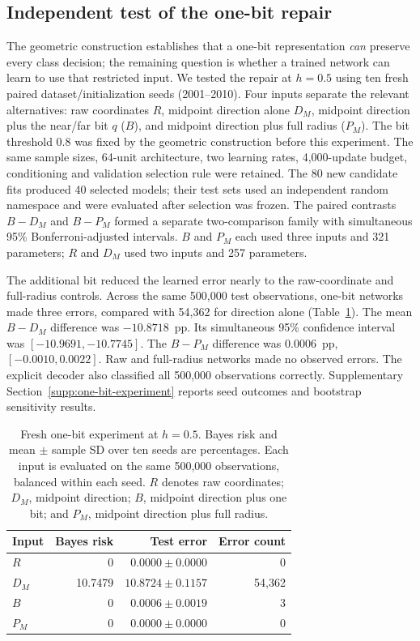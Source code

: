 \subsection{Independent test of the one-bit repair}
\label{sec:one-bit-experiment}
The geometric construction establishes that a one-bit representation \emph{can} preserve every class decision; the remaining question is whether a trained network can learn to use that restricted input. We tested the repair at $h=0.5$ using ten fresh paired dataset/initialization seeds (2001--2010). Four inputs separate the relevant alternatives: raw coordinates $R$, midpoint direction alone $D_M$, midpoint direction plus the near/far bit $q$ ($B$), and midpoint direction plus full radius ($P_M$). The bit threshold $0.8$ was fixed by the geometric construction before this experiment. The same sample sizes, 64-unit architecture, two learning rates, 4,000-update budget, conditioning and validation selection rule were retained. The 80 new candidate fits produced 40 selected models; their test sets used an independent random namespace and were evaluated after selection was frozen. The paired contrasts $B-D_M$ and $B-P_M$ formed a separate two-comparison family with simultaneous 95\% Bonferroni-adjusted intervals. $B$ and $P_M$ each used three inputs and 321 parameters; $R$ and $D_M$ used two inputs and 257 parameters.

The additional bit reduced the learned error nearly to the raw-coordinate and full-radius controls. Across the same 500,000 test observations, one-bit networks made three errors, compared with 54,362 for direction alone (Table~\ref{tab:one-bit-neural}). The mean $B-D_M$ difference was $-10.8718$~pp. Its simultaneous 95\% confidence interval was $[-10.9691,-10.7745]$. The $B-P_M$ difference was $0.0006$~pp, $[-0.0010,0.0022]$. Raw and full-radius networks made no observed errors. The explicit decoder also classified all 500,000 observations correctly. Supplementary Section~\ref{supp:one-bit-experiment} reports seed outcomes and bootstrap sensitivity results.

\begin{table}[t]
\centering\small
\setlength{\tabcolsep}{3pt}
\caption{Fresh one-bit experiment at $h=0.5$. Bayes risk and mean $\pm$ sample SD over ten seeds are percentages. Each input is evaluated on the same 500,000 observations, balanced within each seed. $R$ denotes raw coordinates; $D_M$, midpoint direction; $B$, midpoint direction plus one bit; and $P_M$, midpoint direction plus full radius.}
\label{tab:one-bit-neural}
\begin{tabular}{lrrr}
\toprule
Input & Bayes risk & Test error & Error count \\
\midrule
$R$ & 0 & $0.0000\pm0.0000$ & 0 \\
$D_M$ & 10.7479 & $10.8724\pm0.1157$ & 54,362 \\
$B$ & 0 & $0.0006\pm0.0019$ & 3 \\
$P_M$ & 0 & $0.0000\pm0.0000$ & 0 \\
\bottomrule
\end{tabular}
\end{table}
